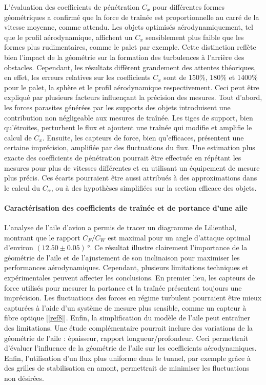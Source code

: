 \documentclass[a4paper, 12pt,oneside]{article}
\begin{document}
L’évaluation des coefficients de pénétration $C_x$ pour différentes formes géométriques a confirmé que la force de traînée est proportionnelle au carré de la vitesse moyenne, comme attendu. Les objets optimisés aérodynamiquement, tel que le profil aérodynamique, affichent un $C_x$ sensiblement plus faible que les formes plus rudimentaires, comme le palet par exemple. Cette distinction reflète bien l’impact de la géométrie sur la formation des turbulences à l’arrière des obstacles. Cependant, les résultats diffèrent grandement des attentes théoriques, en effet, les erreurs relatives sur les coefficients $C_x$ sont de 150\%, 180\% et 1400\% pour le palet, la sphère et le profil aérodynamique respectivement. Ceci peut être expliqué par plusieurs facteurs influençant la précision des mesures. Tout d’abord, les forces parasites générées par les supports des objets introduisent une contribution non négligeable aux mesures de traînée. Les tiges de support, bien qu’étroites, perturbent le flux et ajoutent une traînée qui modifie et amplifie le calcul de $C_x$. Ensuite, les capteurs de force, bien qu’efficaces, présentent une certaine imprécision, amplifiée par des fluctuations du flux. Une estimation plus exacte des coefficients de pénétration pourrait être effectuée en répétant les mesures pour plus de vitesses différentes et en utilisant un équipement de mesure plus précis. Ces écarts pourraient être aussi attribués à des approximations dans le calcul du $C_\alpha$, ou à des hypothèses simplifiées sur la section efficace des objets.

\paragraph{Caractérisation des coefficients de traînée et de portance d’une aile}

L’analyse de l’aile d’avion a permis de tracer un diagramme de Lilienthal, montrant que le rapport $C_F/C_W$ est maximal pour un angle d’attaque optimal d’environ $(12.50\pm0.05)$\,°. Ce résultat illustre clairement l’importance de la géométrie de l’aile et de l’ajustement de son inclinaison pour maximiser les performances aérodynamiques. Cependant, plusieurs limitations techniques et expérimentales peuvent affecter les conclusions. En premier lieu, les capteurs de force utilisés pour mesurer la portance et la traînée présentent toujours une imprécision. Les fluctuations des forces en régime turbulent pourraient être mieux capturées à l’aide d’un système de mesure plus sensible, comme un capteur à fibre optique [\ref{ref8}]. Enfin, la simplification du modèle de l’aile peut entraîner des limitations. Une étude complémentaire pourrait inclure des variations de la géométrie de l’aile : épaisseur, rapport longueur/profondeur. Ceci permettrait d'évaluer l'influence de la géométrie de l'aile sur les coefficients aérodynamiques. Enfin, l’utilisation d’un flux plus uniforme dans le tunnel, par exemple grâce à des grilles de stabilisation en amont, permettrait de minimiser les fluctuations non désirées.
\end{document}
